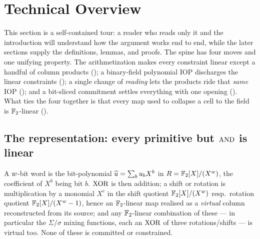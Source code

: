 \section{Technical Overview}
\label{sec:overview}

This section is a self-contained tour: a reader who reads only it and the
introduction will understand how the argument works end to end, while the later
sections supply the definitions, lemmas, and proofs. The spine has four moves
and one unifying property. The arithmetization makes every constraint linear
except a handful of column products (); a binary-field
polynomial IOP discharges the linear constraints ();
a single change of \emph{reading} lets the products ride that \emph{same} IOP
(); and a bit-sliced commitment settles everything with
one opening (). What ties the four together is that
every map used to collapse a cell to the field is $\mathbb{F}_2$-linear
().

\subsection{The representation: every primitive but $\operatorname{AND}$ is linear}
\label{sec:overview-rep}

A $w$-bit word is the bit-polynomial $\widehat{u} = \sum_b u_b X^b$ in
$R = \mathbb{F}_2[X]/(X^{w})$, the coefficient of $X^b$ being bit $b$.
$\operatorname{XOR}$ is then addition; a shift or rotation is multiplication by a monomial
$X^c$ in the shift quotient $\mathbb{F}_2[X]/(X^{w})$ resp.\ rotation quotient $\mathbb{F}_2[X]/(X^{w}-1)$, hence an
$\mathbb{F}_2$-linear map realised as a \emph{virtual} column reconstructed from its
source; and any $\mathbb{F}_2$-linear combination of these --- in particular the
$\Sigma/\sigma$ mixing functions, each an $\operatorname{XOR}$ of three rotations/shifts ---
is virtual too. None of these is committed or constrained.

